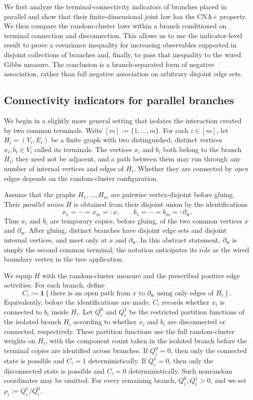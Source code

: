 \documentclass[11pt]{amsart}
\theoremstyle{plain}
\theoremstyle{definition}
\theoremstyle{remark}
\begin{document}
We first analyze the terminal-connectivity indicators of branches placed in parallel and show that their finite-dimensional joint law has the CNA+ property. We then compare the random-cluster laws within a branch conditioned on terminal connection and disconnection. This allows us to use the indicator-level result to prove a covariance inequality for increasing observables supported in disjoint collections of branches and, finally, to pass that inequality to the wired Gibbs measure. The conclusion is a branch-separated form of negative association, rather than full negative association on arbitrary disjoint edge sets.

\subsection{Connectivity indicators for parallel branches}

We begin in a slightly more general setting that isolates the interaction created by two common terminals. Write $[m]:=\{1,\ldots,m\}$. For each $i\in[m]$, let $H_i=(V_i,E_i)$ be a finite graph with two distinguished, distinct vertices $x_i,b_i\in V_i$ called its terminals. The vertices $x_i$ and $b_i$ both belong to the branch $H_i$; they need not be adjacent, and a path between them may run through any number of internal vertices and edges of $H_i$. Whether they are connected by \emph{open} edges depends on the random-cluster configuration.

Assume that the graphs $H_1,\ldots,H_m$ are pairwise vertex-disjoint before gluing. Their \emph{parallel union} $H$ is obtained from their disjoint union by the identifications
\[
    x_1=\cdots=x_m=:x,
    \qquad
    b_1=\cdots=b_m=: \partial_{\mathrm w}.
\]
Thus $x_i$ and $b_i$ are temporary copies, before gluing, of the two common vertices $x$ and $\partial_{\mathrm w}$. After gluing, distinct branches have disjoint edge sets and disjoint internal vertices, and meet only at $x$ and $\partial_{\mathrm w}$. In this abstract statement, $\partial_{\mathrm w}$ is simply the second common terminal; the notation anticipates its role as the wired boundary vertex in the tree application.

We equip $H$ with the random-cluster measure and the prescribed positive edge activities. For each branch, define
\[
    C_i
    :=
    \mathbf 1
    \left\{
        \text{there is an open path from }x\text{ to }\partial_{\mathrm w}
        \text{ using only edges of }H_i
    \right\}.
\]
Equivalently, before the identifications are made, $C_i$ records whether $x_i$ is connected to $b_i$ inside $H_i$. Let $Q_i^0$ and $Q_i^1$ be the restricted partition functions of the isolated branch $H_i$ according to whether $x_i$ and $b_i$ are disconnected or connected, respectively. These partition functions use the full random-cluster weights on $H_i$, with the component count taken in the isolated branch before the terminal copies are identified across branches. If $Q_i^0=0$, then only the connected state is possible and $C_i=1$ deterministically. If $Q_i^1=0$, then only the disconnected state is possible and $C_i=0$ deterministically. Such nonrandom coordinates may be omitted. For every remaining branch, $Q_i^0,Q_i^1>0$, and we set $\rho_i:=Q_i^1/Q_i^0.$
\end{document}
